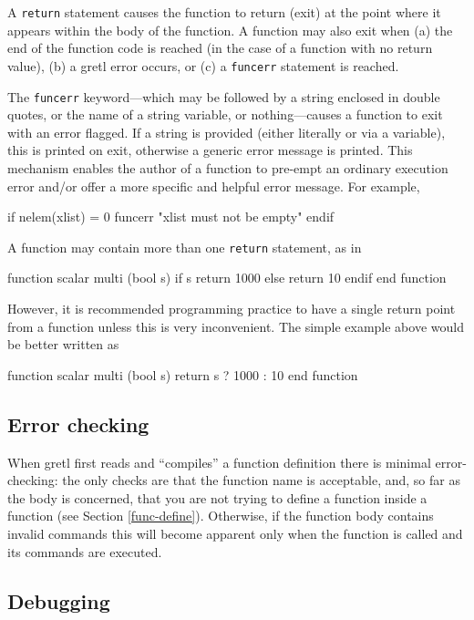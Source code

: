A \texttt{return} statement causes the function to return (exit) at
the point where it appears within the body of the function.  A
function may also exit when (a) the end of the function code is
reached (in the case of a function with no return value), (b) a
gretl error occurs, or (c) a \verb+funcerr+ statement is
reached.

The \verb+funcerr+ keyword---which may be followed by a string
enclosed in double quotes, or the name of a string variable, or
nothing---causes a function to exit with an error flagged.  If a
string is provided (either literally or via a variable), this is
printed on exit, otherwise a generic error message is printed.  This
mechanism enables the author of a function to pre-empt an ordinary
execution error and/or offer a more specific and helpful error
message.  For example,
%
\begin{code}
if nelem(xlist) = 0
   funcerr "xlist must not be empty"
endif
\end{code}

A function may contain more than one \texttt{return} statement, as in
%
\begin{code}
function scalar multi (bool s)
   if s
      return 1000
   else
      return 10
   endif
end function
\end{code}
%
However, it is recommended programming practice to have a single
return point from a function unless this is very inconvenient.  The
simple example above would be better written as
%
\begin{code}
function scalar multi (bool s)
   return s ? 1000 : 10
end function
\end{code}
    

\subsection{Error checking}

When gretl first reads and ``compiles'' a function definition there is
minimal error-checking: the only checks are that the function name is
acceptable, and, so far as the body is concerned, that you are not
trying to define a function inside a function (see Section
\ref{func-define}). Otherwise, if the function body contains invalid
commands this will become apparent only when the function is called
and its commands are executed.

\subsection{Debugging}

